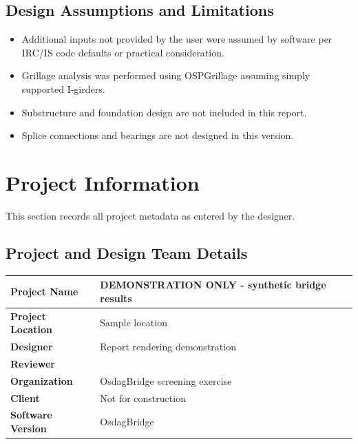 \documentclass[12pt,a4paper]{report}
\numberwithin{table}{chapter}
\numberwithin{figure}{chapter}
\begin{document}
\section*{Design Assumptions and Limitations}
\label{sec:assumptions}

\begin{itemize}
\item Additional inputs not provided by the user were assumed by software per IRC/IS code defaults or practical consideration.
\item Grillage analysis was performed using OSPGrillage assuming simply supported I-girders.
\item Substructure and foundation design are not included in this report.
\item Splice connections and bearings are not designed in this version.
\end{itemize}

\titleformat{\chapter}[block]{\normalfont\Large\bfseries\centering}{\thechapter}{1em}{}
\titlespacing*{\chapter}{0pt}{-30pt}{10pt}


\chapter{Project Information}

This section records all project metadata as entered by the designer.

\section{Project and Design Team Details}
\label{sec:project-details}

\begin{tabular}{|L{5.5cm}|L{8.5cm}|}
\hline
\textbf{Project Name} & DEMONSTRATION ONLY - synthetic bridge results \\
\hline
\textbf{Project Location} & Sample location \\
\hline
\textbf{Designer} & Report rendering demonstration \\
\hline
\textbf{Reviewer} &  \\
\hline
\textbf{Organization} & OsdagBridge screening exercise \\
\hline
\textbf{Client} & Not for construction \\
\hline
\textbf{Software Version} & OsdagBridge \\
\hline
\end{tabular}
\end{document}
